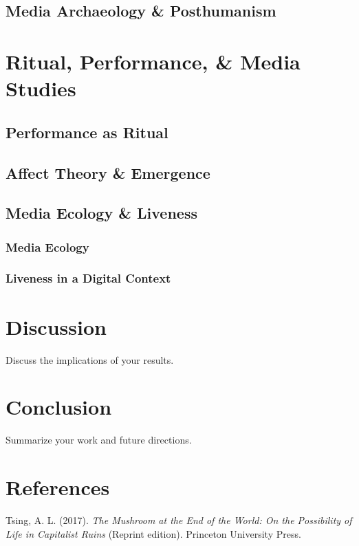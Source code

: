 \documentclass[
  american,
  12pt,
]{article}
\newlength{\cslhangindent}
\newenvironment{CSLReferences}[2] %
 {\begin{list}{}{%
  \setlength{\itemindent}{0pt}
  \setlength{\leftmargin}{0pt}
  \setlength{\parsep}{0pt}
  \ifodd #1
   \setlength{\leftmargin}{\cslhangindent}
   \setlength{\itemindent}{-1\cslhangindent}
  \fi
  \setlength{\itemsep}{#2\baselineskip}}}
 {\end{list}}
\begin{document}
\subsection{Media Archaeology \&
Posthumanism}\label{media-archaeology-posthumanism}

\section{Ritual, Performance, \& Media
Studies}\label{ritual-performance-media-studies}

\subsection{Performance as Ritual}\label{performance-as-ritual}

\subsection{Affect Theory \& Emergence}\label{affect-theory-emergence}

\subsection{Media Ecology \& Liveness}\label{media-ecology-liveness}

\subsubsection{Media Ecology}\label{media-ecology}

\subsubsection{Liveness in a Digital
Context}\label{liveness-in-a-digital-context}

\section*{Discussion}\label{discussion}

Discuss the implications of your results.

\section*{Conclusion}\label{conclusion}

Summarize your work and future directions.

\section*{References}\label{references}

\protect{}\label{refs}
\begin{CSLReferences}{1}{0}
Tsing, A. L. (2017). \emph{The {Mushroom} at the {End} of the {World}:
{On} the {Possibility} of {Life} in {Capitalist Ruins}} (Reprint
edition). Princeton University Press.

\end{CSLReferences}
\end{document}
